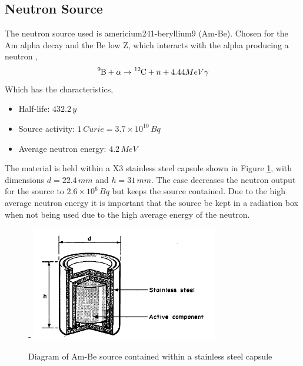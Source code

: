 \documentclass[a4paper]{article}
\begin{document}
\subsection{Neutron Source}
The neutron source used is americium241-beryllium9 (Am-Be). Chosen for the Am alpha decay and the Be low Z, which interacts with the alpha producing a neutron \cite{nrc},
\begin{equation}
    \ce{^{9}B} + \alpha \rightarrow \ce{^{12}C} + n + 4.44MeV \gamma
\end{equation}
Which has the characteristics,
\begin{itemize}
    \item[] {Half-life: $432.2\,y$}
    \item[] {Source activity: $1\,Curie = 3.7 \times 10^{10}\,Bq$}
    \item[] {Average neutron energy: $4.2\,MeV$}
\end{itemize}
The material is held within a X3 stainless steel capsule shown in Figure \ref{fig:ambe}, with dimensions $d = 22.4\,mm$ and $h = 31\,mm$. The case decreases the neutron output for the source to $2.6 \times 10^{6}\,Bq$ but keeps the source contained. Due to the high average neutron energy it is important that the source be kept in a radiation box when not being used due to the high average energy of the neutron.
\begin{figure}[H]-
    \centering
    \includegraphics[height=5cm]{ambe.png}
    \caption{Diagram of Am-Be source contained within a stainless steel capsule \cite{LORCH1973585}}
    \label{fig:ambe}
\end{figure}
\end{document}
